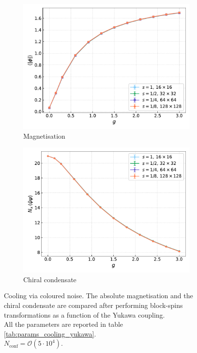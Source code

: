\begin{figure}[hbp]
    \centering
    \begin{subfigure}[b]{0.47\textwidth}
        \includegraphics[width=\textwidth]{figures/cooling/yukawa_scan/magnetisation.pdf}
        \caption{Magnetisation}
    \end{subfigure}
    \hfill
    \begin{subfigure}[b]{0.47\textwidth}
        \includegraphics[width=\textwidth]{figures/cooling/yukawa_scan/condensate.pdf}
        \caption{Chiral condensate}
    \end{subfigure}
    \caption[Cooling stochastic quantisation: fields as a function of the Yukawa coupling.]{Cooling via coloured noise. The absolute magnetisation and the chiral condensate are compared after performing block-spins transformations as a function of the Yukawa coupling. \\ All the parameters are reported in table \ref{tab:params_cooling_yukawa}. \\$N_\text{conf} = \mathcal{O}(5 \cdot 10^4)$. }
    \label{fig:cooling_M_psibarpsi}
\end{figure}
